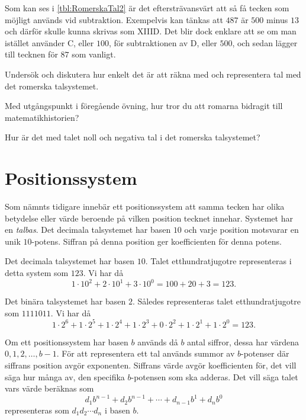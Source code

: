 Som kan ses i \cref{tbl:RomerskaTal2} är det eftersträvansvärt att så få
tecken som möjligt används vid subtraktion.
Exempelvis kan tänkas att \(487\) är \(500\) minus \(13\) och därför skulle
kunna skrivas som XIIID.\@
Det blir dock enklare att se om man istället använder C, eller \(100\), för
subtraktionen av D, eller \(500\), och sedan lägger till tecknen för \(87\)
som vanligt.

\begin{exercise}\label{xrc:RaknaMedRomerskaTal}
  Undersök och diskutera hur enkelt det är att räkna med och
  representera tal med det romerska talsystemet.
\end{exercise}
\begin{exercise}
  Med utgångspunkt i föregående övning, hur tror du att romarna bidragit till
  matematikhistorien?
\end{exercise}
\begin{exercise}
  Hur är det med talet noll och negativa tal i det romerska talsystemet?
\end{exercise}



\section{Positionssystem}
\label{sec:Positionssystem}
Som nämnts tidigare innebär ett positionssystem att samma tecken
har olika betydelse eller värde beroende på vilken position tecknet innehar.
Systemet har en \emph{talbas}.
Det decimala talsystemet har basen \(10\) och varje position motsvarar en
unik \(10\)-potens.
Siffran på denna position ger koefficienten för denna potens.

\begin{example}\label{ex:DecimaltPosistionssystem}
  Det decimala talsystemet har basen \(10\).
  Talet etthundratjugotre representeras i detta system som \(123\).
  Vi har då
  \[1\cdot10^2 + 2\cdot10^1 + 3\cdot10^0 = 100 + 20 + 3 = 123.\]
\end{example}
\begin{example}\label{ex:BinartPositionssystem}
  Det binära talsystemet har basen \(2\).
  Således representeras talet etthundratjugotre som \(1111011\).
  Vi har då
  \[1\cdot2^6 + 1\cdot2^5 + 1\cdot 2^4 + 1\cdot2^3 + 0\cdot2^2 +
  1\cdot2^1 + 1\cdot2^0 = 123.\]
\end{example}
\begin{example}
  Om ett positionssystem har basen \(b\) används då \(b\) antal siffror,
  dessa har värdena \(0, 1, 2, \ldots, b-1\).
  För att representera ett tal används summor av \(b\)-potenser där siffrans
  position avgör exponenten.
  Siffrans värde avgör koefficienten för, det vill säga hur många av, den
  specifika \(b\)-potensen som ska adderas.
  Det vill säga talet vars värde beräknas som
  \[
    d_1 b^{n-1} + d_2 b^{n-1} + \cdots + d_{n-1} b^1 + d_n b^0
  \]
  representeras som \(d_1d_2\cdots d_n\) i basen \(b\).
\end{example}

